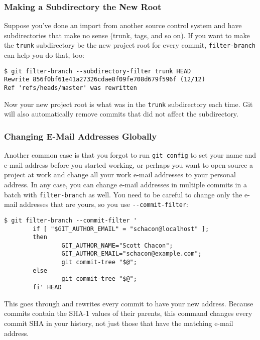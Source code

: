 \documentclass[a4paper]{book}
\begin{document}
\subsubsection{Making a Subdirectory the New Root}

Suppose you've done an import from another source control system and have subdirectories that make no sense (trunk, tags, and so on). If you want to make the \texttt{trunk} subdirectory be the new project root for every commit, \texttt{filter-branch} can help you do that, too:

\begin{shaded}\begin{verbatim}
$ git filter-branch --subdirectory-filter trunk HEAD
Rewrite 856f0bf61e41a27326cdae8f09fe708d679f596f (12/12)
Ref 'refs/heads/master' was rewritten
\end{verbatim}\end{shaded}

Now your new project root is what was in the \texttt{trunk} subdirectory each time. Git will also automatically remove commits that did not affect the subdirectory.

\subsubsection{Changing E-Mail Addresses Globally}

Another common case is that you forgot to run \texttt{git config} to set your name and e-mail address before you started working, or perhaps you want to open-source a project at work and change all your work e-mail addresses to your personal address. In any case, you can change e-mail addresses in multiple commits in a batch with \texttt{filter-branch} as well. You need to be careful to change only the e-mail addresses that are yours, so you use \texttt{-{}-commit-filter}:

\begin{shaded}\begin{verbatim}
$ git filter-branch --commit-filter '
        if [ "$GIT_AUTHOR_EMAIL" = "schacon@localhost" ];
        then
                GIT_AUTHOR_NAME="Scott Chacon";
                GIT_AUTHOR_EMAIL="schacon@example.com";
                git commit-tree "$@";
        else
                git commit-tree "$@";
        fi' HEAD
\end{verbatim}\end{shaded}

This goes through and rewrites every commit to have your new address. Because commits contain the SHA-1 values of their parents, this command changes every commit SHA in your history, not just those that have the matching e-mail address.
\end{document}
